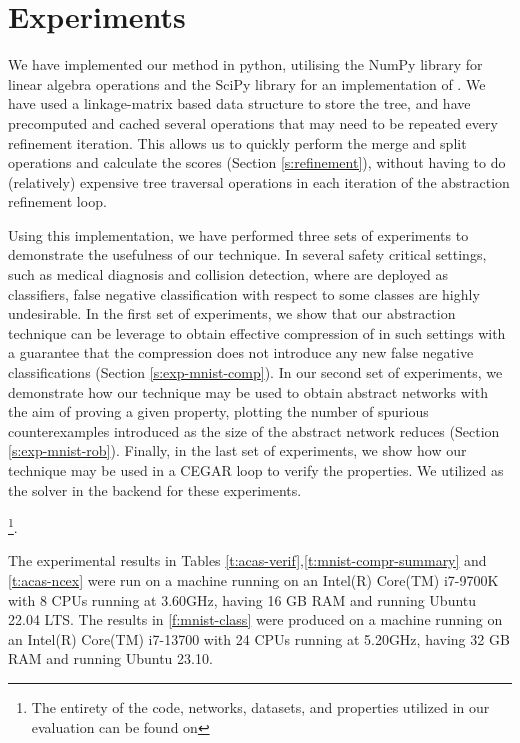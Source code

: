 \section{Experiments}

We have implemented our method in python, utilising the NumPy \cite{numpy}
library for linear algebra operations and the SciPy \cite{scipy} library for an
implementation of \hcluster.
We have used a linkage-matrix \cite{scipy-hcluster-linkage}  based
data structure to store the tree, and have precomputed and cached several
operations that may need to be repeated every refinement iteration. This allows
us to quickly perform the merge and split operations and calculate the
scores (Section \ref{s:refinement}), without having to do (relatively)
expensive tree traversal operations in each iteration of the abstraction
refinement loop. 

Using this implementation, we have performed three sets of experiments to
demonstrate the usefulness of our technique. In several safety critical
settings, such as medical diagnosis and collision detection, where \dnn are
deployed as classifiers, false negative classification with respect to some
classes are highly undesirable. In the first set of experiments, we show that
our abstraction technique can be leverage to obtain effective compression of
\dnn in such settings with a guarantee that the compression does not introduce
any new false negative classifications (Section \ref{s:exp-mnist-comp}). In our
second set of experiments, we demonstrate how our technique may be used to
obtain abstract networks with the aim of proving a given property, plotting the
number of spurious counterexamples introduced as the size of the abstract
network reduces (Section \ref{s:exp-mnist-rob}). Finally, in the last set of
experiments, we show how our technique may be used in a CEGAR loop
\cite{cegar-nn} to verify the \acasxu properties. We utilized \abcrown as the 
solver in the backend for these experiments.



\footnote{The entirety of the code, networks, datasets, and properties utilized in our 
evaluation can be found on }.


The experimental results in Tables
\ref{t:acas-verif},\ref{t:mnist-compr-summary} and \ref{t:acas-ncex} were
run on a machine running on an Intel(R) Core(TM) i7-9700K with 8 CPUs running at
3.60GHz, having 16 GB RAM and running Ubuntu 22.04 LTS. The results in
\ref{f:mnist-class} were produced on a machine running on an 
Intel(R) Core(TM) i7-13700 with 24 CPUs running at
5.20GHz, having 32 GB RAM and running Ubuntu 23.10.

